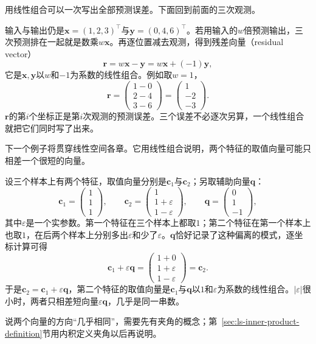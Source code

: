 用线性组合可以一次写出全部预测误差。下面回到前面的三次观测。
\begin{example}[残差向量是线性组合]
\label{ex:ls-residual-vector}
输入与输出仍是$\bm x=(1,2,3)^\top$与$\bm y=(0,4,6)^\top$。若用输入的$w$倍预测输出，三次预测排在一起就是数乘$w\bm x$。再逐位置减去观测，得到残差向量（residual vector）
\[
 \bm r=w\bm x-\bm y=w\bm x+(-1)\bm y,
\]
它是$\bm x,\bm y$以$w$和$-1$为系数的线性组合。例如取$w=1$，
\[
 \bm r=\begin{pmatrix}1-0\\2-4\\3-6\end{pmatrix}=\begin{pmatrix}1\\-2\\-3\end{pmatrix}.
\]
$\bm r$的第$i$个坐标正是第$i$次观测的预测误差。三个误差不必逐次另算，一个线性组合就把它们同时写了出来。
\end{example}

下一个例子将贯穿线性空间各章。它用线性组合说明，两个特征的取值向量可能只相差一个很短的向量。
\begin{example}
\label{ex:ls-nearly-collinear-features}
设三个样本上有两个特征，取值向量分别是$\bm c_1$与$\bm c_2$；另取辅助向量$\bm q$：
\[
 \bm c_1=\begin{pmatrix}1\\1\\1\end{pmatrix},\qquad
 \bm c_2=\begin{pmatrix}1\\1+\varepsilon\\1-\varepsilon\end{pmatrix},\qquad
 \bm q=\begin{pmatrix}0\\1\\-1\end{pmatrix},
\]
其中$\varepsilon$是一个实参数。第一个特征在三个样本上都取$1$；第二个特征在第一个样本上也取$1$，在后两个样本上分别多出$\varepsilon$和少了$\varepsilon$。$\bm q$恰好记录了这种偏离的模式，逐坐标计算可得
\[
 \bm c_1+\varepsilon\bm q=\begin{pmatrix}1+0\\1+\varepsilon\\1-\varepsilon\end{pmatrix}=\bm c_2.
\]
于是$\bm c_2=\bm c_1+\varepsilon\bm q$，第二个特征的取值向量是$\bm c_1$与$\bm q$以$1$和$\varepsilon$为系数的线性组合。$|\varepsilon|$很小时，两者只相差短向量$\varepsilon\bm q$，几乎是同一串数。
\end{example}
说两个向量的方向“几乎相同”，需要先有夹角的概念；第~\ref{sec:ls-inner-product-definition}节用内积定义夹角以后再说明。

